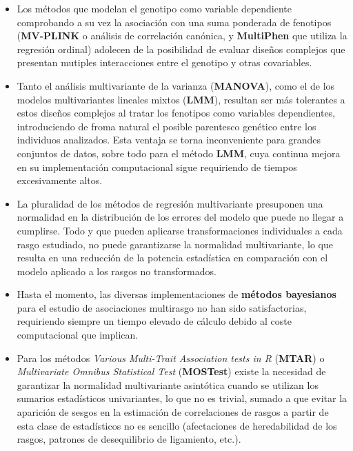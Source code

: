 \documentclass[IB,BIB]{TFUOC}%
\begin{document}
{\small
\begin{itemize}
    \item Los métodos que modelan el genotipo como variable dependiente comprobando a su vez la asociación con una suma ponderada de fenotipos (\textbf{MV-PLINK} o análisis de correlación canónica, y \textbf{MultiPhen} que utiliza la regresión ordinal) adolecen de la posibilidad de evaluar diseños complejos que presentan mutiples interacciones entre el genotipo y otras covariables. 
    \item Tanto el análisis multivariante de la varianza (\textbf{MANOVA}), como el de los modelos multivariantes lineales mixtos (\textbf{LMM}), resultan ser más tolerantes a estos diseños complejos al tratar los fenotipos como variables dependientes, introduciendo de froma natural el posible parentesco genético entre los individuos analizados. Esta ventaja se torna inconveniente para grandes conjuntos de datos, sobre todo para el método \textbf{LMM}, cuya continua mejora en su implementación computacional sigue requiriendo de tiempos excesivamente altos. 
    \item La pluralidad de los métodos de regresión multivariante presuponen una normalidad en la distribución de los errores del modelo que puede no llegar a cumplirse. Todo y que pueden aplicarse transformaciones individuales a cada rasgo estudiado, no puede garantizarse la normalidad multivariante, lo que resulta en una reducción de la potencia estadística en comparación con el modelo aplicado a los rasgos no transformados.
    \item Hasta el momento, las diversas implementaciones de \textbf{métodos bayesianos} para el estudio de asociaciones multirasgo no han sido satisfactorias, requiriendo siempre un tiempo elevado de cálculo debido al coste computacional que implican.
    \item Para los métodos \textit{Various Multi-Trait Association tests in R} (\textbf{MTAR}) o \textit{Multivariate Omnibus Statistical Test} (\textbf{MOSTest}) existe la necesidad de garantizar la normalidad multivariante asintótica cuando se utilizan los sumarios estadísticos univariantes, lo que no es trivial, sumado a que evitar la aparición de sesgos en la estimación de correlaciones de rasgos a partir de esta clase de estadísticos no es sencillo (afectaciones de heredabilidad de los rasgos, patrones de desequilibrio de ligamiento, etc.).
\end{itemize}}
\end{document}
